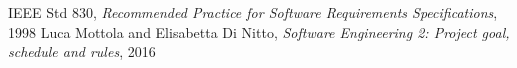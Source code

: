 	IEEE Std 830, \emph{Recommended Practice for Software Requirements Specifications}, 1998
	Luca Mottola and Elisabetta Di Nitto, \emph{Software Engineering 2: Project goal, schedule and rules}, 2016
	